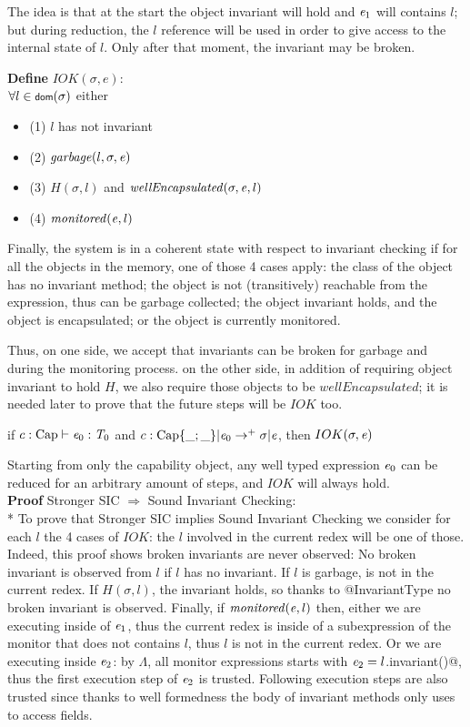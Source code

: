 The idea is that at the start the object invariant will hold and ${\mathit{e}}_1$ will contains $l$;
but during reduction, the $l$ reference will be used in order to
give access to the internal state of $l$. Only after that moment, the invariant may be broken.


\noindent\textbf{Define} $IOK(\sigma,e)$:\\
${}_{}$\quad\quad  $\forall l\in\dom(\sigma)$
  either
\begin{itemize}
   \item${}_{}$\quad\quad   (1) $l$ has not invariant
   \item${}_{}$\quad\quad   (2) $\mathit{garbage}(l,\sigma,\e)$
   \item${}_{}$\quad\quad   (3) $H(\sigma,l)$ and $\mathit{wellEncapsulated}(\sigma,\e,l)$
   \item${}_{}$\quad\quad   (4) $\mathit{monitored}({\mathit{e}},l)$
\end{itemize}

\noindent
Finally, the system is in a coherent state with respect to invariant checking 
if for all the objects in the memory, one of those 4 cases apply:
the class of the object has no invariant method;
the object is not (transitively) reachable from the expression, thus can be garbage collected;
the object invariant holds, and the object is encapsulated;
or the object is currently monitored.

Thus, on one side, we accept that invariants can be broken for garbage and during the monitoring process.
on the other side, in addition of requiring object invariant to hold $H$, we
also require those objects to be $\mathit{wellEncapsulated}$;
it is needed later to prove that the future steps will be $IOK$ too.


\begin{Theorem}
if $c:\text{Cap}\vdash {\ensuremath{\mathit{e}}}_0: {\mathit{T}}_0$ and
$c:\text{Cap}\{\_;\_\}|\e_0\rightarrow^+ \sigma|\e$, then
$IOK(\sigma,\e)$
\end{Theorem}
\noindent Starting from only the capability object,
any well typed expression ${\mathit{e}}_0$ can be reduced for an arbitrary amount of steps,
and $IOK$ will always hold.
\\
\textbf{Proof }Stronger SIC $\Rightarrow$ Sound Invariant Checking:\\*
\noindent To prove that Stronger SIC implies Sound Invariant Checking
we consider for each $l$ the 4 cases of $IOK$: the $l$ involved in the current redex
will be one of those.
Indeed, this proof shows broken invariants are never observed:
No broken invariant is observed from $l$ if $l$ has no invariant.
If $l$ is garbage, is not in the current redex.
If $H(\sigma,l)$, the invariant holds, so thanks to @InvariantType
no broken invariant is observed.
Finally, if $\mathit{monitored}({\mathit{e}},l)$
then, either we are executing inside of ${\mathit{e}}_1$, thus
the current redex is inside of a subexpression of the monitor that does not contains $l$, thus
$l$ is not in the current redex.
Or we are executing inside ${\mathit{e}}_2$:
by $\Lambda$, all monitor expressions starts with 
${\mathit{e}}_2=l$\Q@.invariant()@, thus the first execution step
of ${\mathit{e}}_2$ is trusted.
Following execution steps are also trusted since thanks
to well formedness the body of invariant methods only
uses \Q@this@ to access fields.


